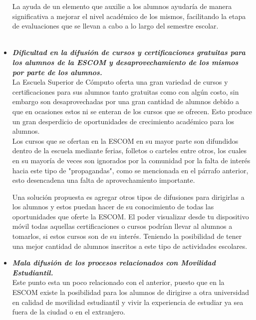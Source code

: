 \begin{itemize}
		La ayuda de un elemento que auxilie a los alumnos ayudaría de manera significativa a mejorar el nivel académico de los mismos, facilitando la etapa de evaluaciones que se llevan a cabo a lo largo del semestre escolar.\\ \\
		
		\item \textbf{\textit{Dificultad en la  difusión de cursos y certificaciones gratuitas para los alumnos de la ESCOM y desaprovechamiento de los mismos por parte de los alumnos.}}\\
		
		La Escuela Superior de Cómputo oferta una gran variedad de cursos y certificaciones para sus alumnos tanto gratuitas como con algún costo, sin embargo son desaprovechadas por una gran cantidad de alumnos debido a que en ocasiones estos ni se enteran de los cursos que se ofrecen. Esto produce un gran desperdicio de oportunidades de crecimiento académico para los alumnos.\\
		
		Los cursos que se ofertan en la ESCOM en su mayor parte son difundidos dentro de la escuela mediante ferias, folletos o carteles entre otros, los cuales en su mayoría de veces son ignorados por la comunidad por la falta de interés hacia este tipo de "propagandas", como se mencionada en el párrafo anterior, esto desencadena una falta de aprovechamiento importante.
		
		Una solución propuesta es agregar otros tipos de difusiones para dirigirlas a los alumnos y estos puedan hacer de su conocimiento de todas las oportunidades que oferte la ESCOM. El poder visualizar desde tu dispositivo móvil todas aquellas certificaciones o cursos podrían llevar al alumnos a tomarlos, si estos cursos son de su interés. Teniendo la posibilidad de tener una mejor cantidad de alumnos inscritos a este tipo de actividades escolares.\\ 
		
		
		
		\item \textbf{\textit{Mala difusión de los procesos relacionados con Movilidad Estudiantil.}}\\
		
		Este punto esta un poco relacionado con el anterior, puesto que en la ESCOM existe la posibilidad para los alumnos de dirigirse a otra universidad en calidad de movilidad estudiantil y vivir la experiencia de estudiar ya sea fuera de la ciudad o en el extranjero. \\
		

\end{itemize}
